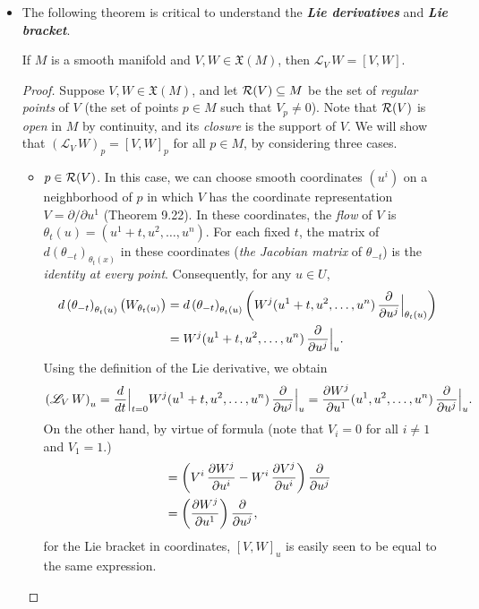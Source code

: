 \documentclass[11pt]{article}
\begin{document}
\begin{itemize}
\item The following theorem is critical to understand the \emph{\textbf{Lie derivatives}} and \emph{\textbf{Lie bracket}}.
\begin{theorem}
If $M$ is a smooth manifold and $V, W \in \mathfrak{X}(M)$, then $\mathscr{L}_{V}\,W = [V, W]$.
\end{theorem}
\begin{proof}
Suppose $V, W \in \mathfrak{X}(M)$, and let ${\mathcal R}(V) \subseteq M$ be the set of \emph{regular points} of $V$ (the set of points $p \in M$ such that $V_p \neq 0$). Note that ${\mathcal R}(V)$ is \emph{open} in $M$ by continuity, and its \emph{closure} is the support of $V$. We will show that $(\mathscr{L}_{V}\,W)_{p} = [V, W]_p$ for all $p \in M$, by considering three cases.
\begin{itemize}
\item $p \in {\mathcal R}(V)$. In this case, we can choose smooth coordinates $(u^i)$ on a neighborhood of $p$ in which $V$ has the coordinate representation $V = \partial/\partial u^{1}$ (Theorem 9.22). In these coordinates, the \emph{flow} of $V$ is $\theta_t(u) = (u^1+ t,u^2,\ldots,u^n)$. For each fixed $t$, the matrix of $d(\theta_{-t})_{\theta_t(x)}$ in these coordinates (\emph{the Jacobian matrix} of $\theta_{-t}$) is the \emph{identity at every point}. Consequently, for any $u \in U$,
\begin{align*}
d\left(\theta_{-t}\right)_{\theta_{t}(u)}\left(W_{\theta_t(u)}\right) &= d\left(\theta_{-t}\right)_{\theta_{t}(u)}\left(W^{j}(u^1+ t, u^2, \ldots, u^n)\,\frac{\partial }{ \partial u^{j}}\Bigr|_{\theta_t(u)}\right)\\
&= W^{j}(u^1+ t, u^2, \ldots, u^n)\,\frac{\partial }{ \partial u^{j}}\Bigr|_{u}.
\end{align*} Using the definition of the Lie derivative, we obtain
\begin{align*}
\left(\mathscr{L}_{V}\,W\right)_{u} &= \frac{d}{dt}\Bigr|_{t=0} W^{j}(u^1+ t, u^2, \ldots, u^n)\,\frac{\partial }{ \partial u^{j}}\Bigr|_{u} = \frac{\partial W^{j}}{ \partial u^1}(u^1, u^2, \ldots, u^n)\,\frac{\partial }{ \partial u^{j}}\Bigr|_{u}.
\end{align*} On the other hand, by virtue of formula (note that $V_i =0$ for all $i\neq 1$ and $V_1 = 1$.)
\begin{align}
[V, W]&= \paren{V^{i}\,\partdiff{W^{j}}{u^{i}} - W^{i}\,\partdiff{V^{j}}{u^{i}} }\partdiff{}{u^{j}} \label{eqn: lie_bracket}\\
&= \paren{\partdiff{W^{j}}{u^{1}} }\partdiff{}{u^{j}},  \nonumber
\end{align}
 for the Lie bracket in coordinates, $[V, W]_u$ is easily seen to be equal to the same expression.
 

\end{itemize}
\end{proof}
\end{itemize}
\end{document}
